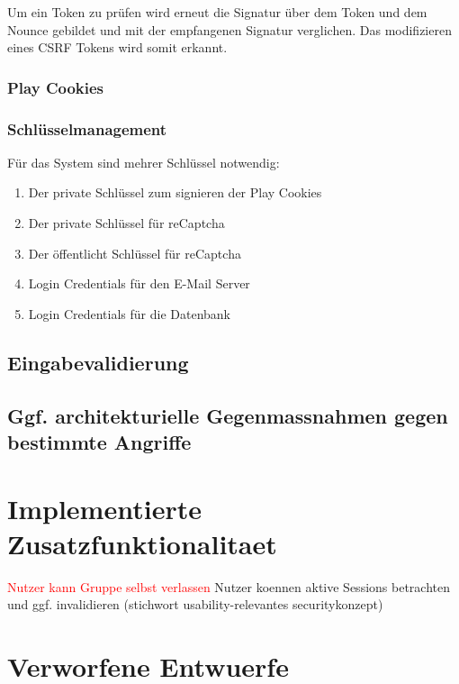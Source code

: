 \documentclass[12pt,DIV14,BCOR10mm,a4paper,twoside,parskip=half-,headsepline,headinclude,english,ngerman,bibliography=totocnumbered]{scrreprt}
\begin{document}
Um ein Token zu prüfen wird erneut die Signatur über dem Token und dem Nounce gebildet und mit der empfangenen Signatur verglichen. Das modifizieren eines CSRF Tokens wird somit erkannt.



\subsection{Play Cookies}


\subsection{Schlüsselmanagement}
Für das System sind mehrer Schlüssel notwendig:

\begin{enumerate}
	\item Der private Schlüssel zum signieren der Play Cookies
	\item Der private Schlüssel für reCaptcha
	\item Der öffentlicht Schlüssel für reCaptcha
	\item Login Credentials für den E-Mail Server
	\item Login Credentials für die Datenbank
\end{enumerate}


\section{Eingabevalidierung}

\section{Ggf. architekturielle Gegenmassnahmen gegen bestimmte Angriffe}

\chapter{Implementierte Zusatzfunktionalitaet}

\textcolor{red}{Nutzer kann Gruppe selbst verlassen}
Nutzer koennen aktive Sessions betrachten und ggf. invalidieren (stichwort usability-relevantes securitykonzept)

\chapter{Verworfene Entwuerfe}

\printbibliography

\printacronyms[title=Abkürzungsverzeichnis,toctitle=Abkürzungsverzeichnis]
\printglossary[type=main]

\listoffigures      %

\end{document}
